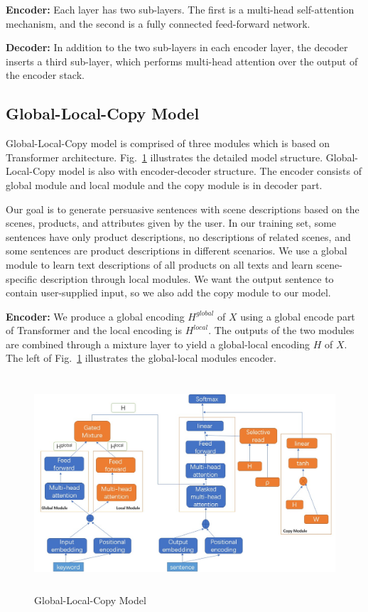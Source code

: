 \documentclass[sigconf]{acmart}
\begin{document}
\textbf{Encoder:} Each layer has two sub-layers. The first is a multi-head self-attention mechanism, and the second is a fully connected feed-forward network.

\textbf{Decoder:} In addition to the two sub-layers in each encoder layer, the decoder inserts a third sub-layer, which performs multi-head attention over the output of the encoder stack. 


\subsection{Global-Local-Copy Model}
Global-Local-Copy model is comprised of three modules which is based on Transformer architecture. Fig.~\ref{fig:model} illustrates the detailed model structure. Global-Local-Copy model is also with encoder-decoder structure. The encoder consists of global module and local module and the copy module is in decoder part. 

Our goal is to generate persuasive sentences with scene descriptions based on the scenes, products, and attributes given by the user. In our training set, some sentences have only product descriptions, no descriptions of related scenes, and some sentences are product descriptions in different scenarios. We use a global module to learn text descriptions of all products on all texts and learn scene-specific description through local modules. We want the output sentence to contain user-supplied input, so we also add the copy module to our model.

\textbf{Encoder:} We produce a global encoding $H^{global}$ of $X$ using a global encode part of Transformer and the local encoding is $H^{local}$. The outputs of the two modules are combined through a mixture layer to yield a global-local encoding $H$ of $X$. The left of Fig.~\ref{fig:model} illustrates the global-local modules encoder. 
\begin{figure}
    \centering
    \includegraphics[width=12cm,height=8cm]{model2.jpg}
\caption{Global-Local-Copy Model}\label{fig:model}
\end{figure}
\end{document}
